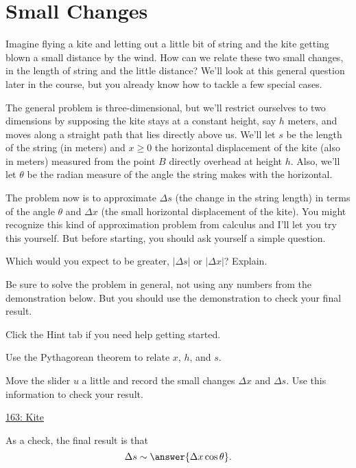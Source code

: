 \documentclass{ximera}
\begin{document}
\section*{Small Changes}
Imagine flying a kite and letting out a little bit of string and the kite getting blown a small distance by the wind. How can we relate these two small changes, in the length of string and the little distance? We'll look at this general question later in the course, but you already know how to tackle a few special cases.


\begin{question}  \label{Q:09df0g4444e}
The general problem is three-dimensional, but we'll restrict ourselves to two dimensions by supposing the kite stays at a constant height, say $h$ meters, and moves along a straight path that lies directly above us. We'll let $s$ be the length of the string (in meters) and $x\geq 0$ the horizontal displacement of the kite (also in meters) measured from the point $B$ directly overhead at height $h$. Also, we'll let $\theta$ be the radian measure of the angle the string makes with the horizontal.

The problem now is to approximate $\Delta s$ (the change in the string length) in terms of the angle $\theta$ and $\Delta x$ (the small horizontal displacement of the kite). You might recognize this kind of approximation problem from calculus and I'll let you try this yourself. But before starting, you should ask yourself a simple question. 

\begin{freeResponse}
Which would you expect to be greater, $|\Delta s|$ or $|\Delta x|$? Explain.
\end{freeResponse}

Be sure to solve the problem in general, not using any numbers from the demonstration below. But you should use the demonstration to check your final result.

Click the Hint tab if you need help getting started.

\begin{hint}
Use the Pythagorean theorem to relate $x$, $h$, and $s$. 
\end{hint} 

\begin{exploration}
Move the slider $u$ a little and record the small changes $\Delta x$ and $\Delta s$. Use this information to check your result. 
\begin{onlineOnly}
    \begin{center}
\end{center}
\end{onlineOnly}

\href{https://www.desmos.com/calculator/7yad8xxxt8}{163: Kite}
\end{exploration}

As a check, the final result is that
\[
    \Delta s \sim \answer{\Delta x \cos\theta} .
\]

\end{question}
\end{document}
